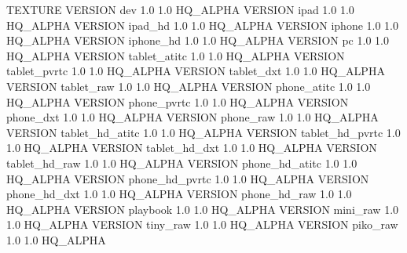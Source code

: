 TEXTURE
{
	VERSION dev			1.0 1.0		HQ_ALPHA 
	VERSION ipad		1.0 1.0 	HQ_ALPHA 
	VERSION ipad_hd		1.0 1.0 	HQ_ALPHA 
	VERSION iphone 		1.0 1.0 	HQ_ALPHA 
	VERSION iphone_hd	1.0 1.0		HQ_ALPHA 
	VERSION pc 			1.0 1.0 	HQ_ALPHA 
	VERSION tablet_atitc	1.0	1.0	HQ_ALPHA 
	VERSION tablet_pvrtc	1.0	1.0	HQ_ALPHA 
	VERSION tablet_dxt		1.0	1.0	HQ_ALPHA 
	VERSION tablet_raw		1.0	1.0	HQ_ALPHA 
	VERSION phone_atitc		1.0	1.0	HQ_ALPHA 
	VERSION phone_pvrtc		1.0	1.0	HQ_ALPHA 
	VERSION phone_dxt		1.0	1.0	HQ_ALPHA 
	VERSION phone_raw		1.0	1.0	HQ_ALPHA 
	VERSION tablet_hd_atitc	1.0	1.0	HQ_ALPHA 
	VERSION tablet_hd_pvrtc	1.0	1.0	HQ_ALPHA 
	VERSION tablet_hd_dxt	1.0	1.0	HQ_ALPHA 
	VERSION tablet_hd_raw	1.0	1.0	HQ_ALPHA 
	VERSION phone_hd_atitc	1.0	1.0	HQ_ALPHA 
	VERSION phone_hd_pvrtc	1.0	1.0	HQ_ALPHA 
	VERSION phone_hd_dxt	1.0	1.0	HQ_ALPHA 
	VERSION phone_hd_raw	1.0	1.0	HQ_ALPHA 
	VERSION playbook		1.0 1.0 HQ_ALPHA 
	VERSION mini_raw		1.0 1.0	HQ_ALPHA
	VERSION tiny_raw		1.0 1.0	HQ_ALPHA
	VERSION piko_raw		1.0 1.0	HQ_ALPHA
}
